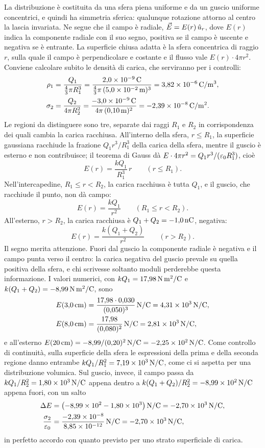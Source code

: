 \documentclass[11pt,a4paper]{article}
\begin{document}
La distribuzione è costituita da una sfera piena uniforme e da un guscio uniforme concentrici, e quindi ha simmetria sferica: qualunque rotazione attorno al centro la lascia invariata. Ne segue che il campo è radiale, $\vec{E}=E(r)\,\hat{u}_r$, dove $E(r)$ indica la componente radiale con il suo segno, positiva se il campo è uscente e negativa se è entrante. La superficie chiusa adatta è la sfera concentrica di raggio $r$, sulla quale il campo è perpendicolare e costante e il flusso vale $E(r)\cdot4\pi r^2$. Conviene calcolare subito le densità di carica, che serviranno per i controlli:
\begin{align*}
\rho_1&=\frac{Q_1}{\tfrac43\pi R_1^3}=\frac{2{,}0\times10^{-9}\,\mathrm{C}}{\tfrac43\pi\,(5{,}0\times10^{-2}\,\mathrm{m})^3}=3{,}82\times10^{-6}\,\mathrm{C/m^3},\\
\sigma_2&=\frac{Q_2}{4\pi R_2^2}=\frac{-3{,}0\times10^{-9}\,\mathrm{C}}{4\pi\,(0{,}10\,\mathrm{m})^2}=-2{,}39\times10^{-8}\,\mathrm{C/m^2}.
\end{align*}
Le regioni da distinguere sono tre, separate dai raggi $R_1$ e $R_2$ in corrispondenza dei quali cambia la carica racchiusa. All'interno della sfera, $r\le R_1$, la superficie gaussiana racchiude la frazione $Q_1r^3/R_1^3$ della carica della sfera, mentre il guscio è esterno e non contribuisce; il teorema di Gauss dà $E\cdot4\pi r^2=Q_1r^3/(\varepsilon_0 R_1^3)$, cioè
\[
E(r)=\frac{kQ_1}{R_1^3}\,r\qquad(r\le R_1).
\]
Nell'intercapedine, $R_1\le r<R_2$, la carica racchiusa è tutta $Q_1$, e il guscio, che racchiude il punto, non dà campo:
\[
E(r)=\frac{kQ_1}{r^2}\qquad(R_1\le r<R_2).
\]
All'esterno, $r>R_2$, la carica racchiusa è $Q_1+Q_2=-1{,}0\,\mathrm{nC}$, negativa:
\[
E(r)=\frac{k(Q_1+Q_2)}{r^2}\qquad(r>R_2).
\]
Il segno merita attenzione. Fuori dal guscio la componente radiale è negativa e il campo punta verso il centro: la carica negativa del guscio prevale su quella positiva della sfera, e chi scrivesse soltanto moduli perderebbe questa informazione. I valori numerici, con $kQ_1=17{,}98\,\mathrm{N\,m^2/C}$ e $k(Q_1+Q_2)=-8{,}99\,\mathrm{N\,m^2/C}$, sono
\begin{align*}
E(3{,}0\,\mathrm{cm})&=\frac{17{,}98\cdot0{,}030}{(0{,}050)^3}\,\mathrm{N/C}=4{,}31\times10^3\,\mathrm{N/C},\\
E(8{,}0\,\mathrm{cm})&=\frac{17{,}98}{(0{,}080)^2}\,\mathrm{N/C}=2{,}81\times10^3\,\mathrm{N/C},
\end{align*}
e all'esterno $E(20\,\mathrm{cm})=-8{,}99/(0{,}20)^2\,\mathrm{N/C}=-2{,}25\times10^2\,\mathrm{N/C}$. Come controllo di continuità, sulla superficie della sfera le espressioni della prima e della seconda regione danno entrambe $kQ_1/R_1^2=7{,}19\times10^3\,\mathrm{N/C}$, come ci si aspetta per una distribuzione volumica. Sul guscio, invece, il campo passa da $kQ_1/R_2^2=1{,}80\times10^3\,\mathrm{N/C}$ appena dentro a $k(Q_1+Q_2)/R_2^2=-8{,}99\times10^2\,\mathrm{N/C}$ appena fuori, con un salto
\begin{align*}
\Delta E&=\bigl(-8{,}99\times10^2-1{,}80\times10^3\bigr)\,\mathrm{N/C}=-2{,}70\times10^3\,\mathrm{N/C},\\
\frac{\sigma_2}{\varepsilon_0}&=\frac{-2{,}39\times10^{-8}}{8{,}85\times10^{-12}}\,\mathrm{N/C}=-2{,}70\times10^3\,\mathrm{N/C},
\end{align*}
in perfetto accordo con quanto previsto per uno strato superficiale di carica.
\end{document}
